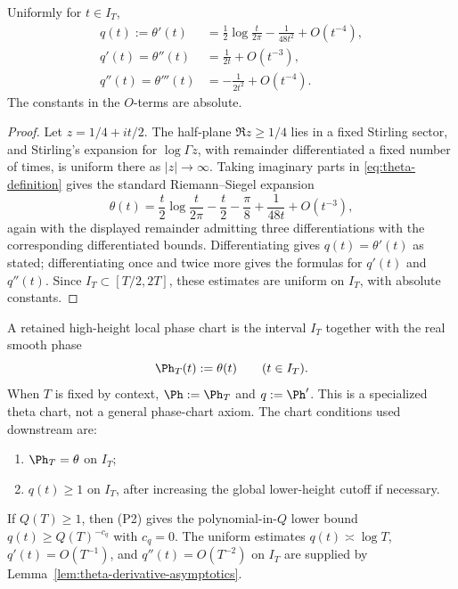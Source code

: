 \begin{lemma}
\label{lem:theta-derivative-asymptotics}
Uniformly for \(t\in I_T\),
\begin{align}
\label{eq:theta-derivative-asymptotics}
q(t):=\theta'(t)
&=\frac12\log\frac{t}{2\pi}-\frac{1}{48 t^2}+O(t^{-4}),\\
q'(t)=\theta''(t)
&=\frac{1}{2t}+O(t^{-3}),\\
q''(t)=\theta'''(t)
&=-\frac{1}{2t^2}+O(t^{-4}).
\end{align}
The constants in the \(O\)-terms are absolute.
\end{lemma}

\begin{proof}
Let \(z=1/4+it/2\).  The half-plane \(\Re z\ge 1/4\) lies in a fixed
Stirling sector, and Stirling's expansion for \(\log\Gamma z\), with
remainder differentiated a fixed number of times, is uniform there as
\(|z|\to\infty\).  Taking imaginary parts in \eqref{eq:theta-definition}
gives the standard Riemann--Siegel expansion
\[
\theta(t)=\frac{t}{2}\log\frac{t}{2\pi}-\frac{t}{2}-\frac{\pi}{8}
          +\frac{1}{48 t}+O(t^{-3}),
\]
again with the displayed remainder admitting three differentiations
with the corresponding differentiated bounds.  Differentiating gives
\(q(t)=\theta'(t)\) as stated; differentiating once and twice more gives
the formulas for \(q'(t)\) and \(q''(t)\).  Since
\(I_T\subset[T/2,2T]\), these estimates are uniform on \(I_T\), with
absolute constants.
\end{proof}

\begin{definition}
\label{def:local-phase-chart}
A retained high-height local phase chart is the interval \(I_T\)
together with the real smooth phase
\[
        \Ph_T(t):=\theta(t)\qquad (t\in I_T).
\]
When \(T\) is fixed by context, \(\Ph := \Ph_T\) and \(q := \Ph'\).
This is a specialized theta chart, not a general phase-chart axiom.
The chart conditions used downstream are:
\begin{enumerate}[label=\textup{(P\arabic*)},leftmargin=*]
\item \(\Ph_T = \theta\) on \(I_T\);
\item \(q(t)\ge 1\) on \(I_T\), after increasing the global lower-height
      cutoff if necessary.
\end{enumerate}
If \(Q(T)\ge 1\), then (P2) gives the polynomial-in-\(Q\) lower bound
\(q(t)\ge Q(T)^{-c_q}\) with \(c_q = 0\).  The uniform estimates
\(q(t)\asymp \log T\), \(q'(t)=O(T^{-1})\), and
\(q''(t)=O(T^{-2})\) on \(I_T\) are supplied by
Lemma~\ref{lem:theta-derivative-asymptotics}.
\end{definition}

